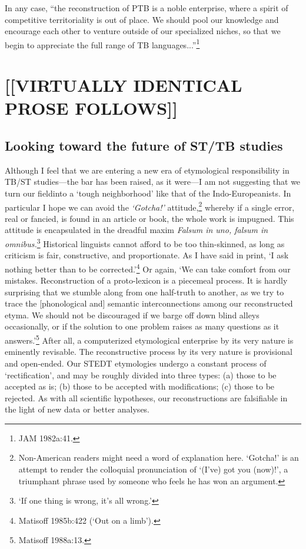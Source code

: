 In any case, “the reconstruction of PTB is a noble enterprise, where a spirit of competitive territoriality is out of place. We should pool our knowledge and encourage each other to venture outside of our specialized niches, so that we begin to appreciate the full range of TB languages...”\footnote{JAM 1982a:41.}

\section{[[VIRTUALLY IDENTICAL PROSE FOLLOWS]]}

\subsection{Looking toward the future of ST/TB studies}


Although I feel that we are entering a new era of etymological
responsibility in TB/ST studies—the bar has been raised, as it were—I am
not suggesting that we turn our fieldinto a ‘tough neighborhood’ like that of
the Indo-Europeanists. In particular I hope we can avoid the \textit{‘Gotcha!’}
attitude,\footnote{Non-American readers might need a word of explanation here. 
‘Gotcha!’ is an attempt to render the colloquial pronunciation of ‘(I’ve) got
you (now)!’, a triumphant phrase used by someone who feels he has won an
argument.} whereby if a single error, real or fancied, is found in an article or
book, the whole work is impugned. This attitude is encapsulated in the dreadful
maxim \textit{Falsum in uno, falsum in omnibus.}\footnote{‘If one thing is wrong, it’s
all wrong.’} Historical linguists cannot afford to be too thin-skinned, as long
as criticism is fair, constructive, and proportionate. As I have said in print,
‘I ask nothing better than to be corrected.’\footnote{Matisoff 1985b:422 (‘Out
on a limb’).}  Or again, ‘We can take comfort from our mistakes. Reconstruction
of a proto-lexicon is a piecemeal process. It is hardly surprising that we
stumble along from one half-truth to another, as we try to trace the
[phonological and] semantic interconnections among our reconstructed etyma. We
should not be discouraged if we barge off down blind alleys occasionally, or if
the solution to one problem raises as many questions as it answers.’\footnote{Matisoff 1988a:13.} After all, a computerized etymological enterprise by its
very nature is eminently revisable.  The reconstructive process by its very
nature is provisional and open-ended.  Our STEDT etymologies undergo a constant
process of ‘rectification’, and may be roughly divided into three types: (a)
those to be accepted as is; (b) those to be accepted with modifications; (c)
those to be rejected.  As with all scientific hypotheses, our reconstructions
are falsifiable in the light of new data or better analyses.


